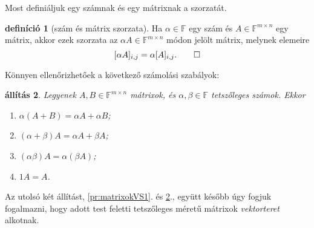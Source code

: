 \documentclass[9pt, a4paper, showtrims]{memoir}
\theoremstyle{plain}
\newtheorem{proposition}{állítás}[chapter]
\theoremstyle{remark}
\theoremstyle{definition}
\newtheorem{definition}[proposition]{definíció}
\begin{document}
Most definiáljuk egy számnak és egy mátrixnak a szorzatát.
\begin{definition}[szám és mátrix szorzata]
    Ha $\alpha\in\mathbb{F}$ egy szám és $A\in\mathbb{F}^{m\times n}$ egy mátrix, akkor ezek szorzata
    az $\alpha A\in\mathbb{F}^{m\times n}$ módon jelölt mátrix, melynek elemeire
    \[
        [\alpha A]_{i,j}=\alpha[A]_{i,j}.\qedhere
    \]
\end{definition}
Könnyen ellenőrizhetőek a következő számolási szabályok:
\begin{proposition}\label{pr:matrixokVS2}
    Legyenek $A,B\in\mathbb{F}^{m\times n}$ mátrixok, és $\alpha,\beta\in\mathbb{F}$ tetszőleges számok.
    Ekkor
    \begin{enumerate}
        \item $\alpha\left( A+B \right)=\alpha A+\alpha B$;
        \item $\left( \alpha+\beta \right)A=\alpha A+\beta A$;
        \item $\left( \alpha\beta \right)A=\alpha\left( \beta A \right)$;
        \item $1 A=A$.\qedhere
    \end{enumerate}
\end{proposition}
Az utolsó két állítást, \ref{pr:matrixokVS1}. és \ref{pr:matrixokVS2}.,
együtt később úgy fogjuk fogalmazni, 
hogy adott test feletti tetszőleges méretű mátrixok \emph{vektorteret} alkotnak.
\end{document}
